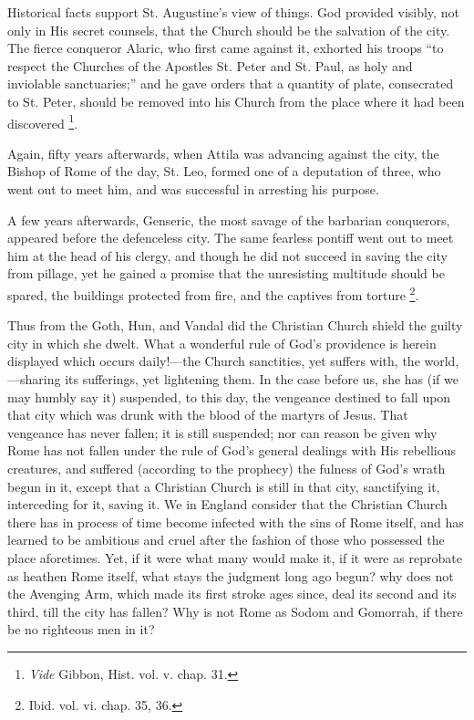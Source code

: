 Historical facts support St. Augustine's view of things. God
provided visibly, not only in His secret counsels, that the Church
should be the salvation of the city. The fierce conqueror Alaric, who
first came against it, exhorted his troops ``to respect the
Churches of the Apostles St. Peter and St. Paul, as holy and
inviolable sanctuaries;'' and he gave orders that a quantity of
plate, consecrated to St. Peter, should be removed into his
Church from the place where it had been discovered \footnote{\emph{Vide} Gibbon, Hist. vol. v. chap.
31.}.

Again, fifty years afterwards, when Attila was advancing against
the city, the Bishop of Rome of the day, St. Leo, formed one of a
deputation of three, who went out to meet him, and was successful in
arresting his purpose.

A few years afterwards, Genseric, the most savage of the barbarian
conquerors, appeared before the defenceless city. The same fearless
pontiff went out to meet him at the head of his clergy, and though he
did not succeed in saving the city from pillage, yet he gained a
promise that the unresisting multitude should be spared, the buildings
protected from fire, and the captives from torture \footnote{Ibid. vol. vi. chap. 35, 36.}.

Thus from the Goth, Hun, and Vandal did the Christian Church shield
the guilty city in which she dwelt. What a wonderful rule of God's
providence is herein displayed which occurs daily!—the Church
sanctities, yet suffers with, the world,—sharing its sufferings, yet
lightening them. In the case before us, she has (if we may humbly say
it) suspended, to this day, the vengeance destined to fall upon that
city which was drunk with the blood of the martyrs of Jesus. That
vengeance has never fallen; it is still suspended; nor can reason be
given why Rome has not fallen under the rule of God's general dealings
with His rebellious creatures, and suffered (according to the
prophecy) the fulness of God's wrath begun in it, except that a
Christian Church is still in that city, sanctifying it, interceding
for it, saving it. We in England consider that the Christian Church
there has in process of time become infected with the sins of Rome
itself, and has learned to be ambitious and cruel after the fashion of
those who possessed the place aforetimes. Yet, if it were what many
would make it, if it were as reprobate as heathen Rome itself,
what stays the judgment long ago begun? why does not the Avenging Arm,
which made its first stroke ages since, deal its second and its third,
till the city has fallen? Why is not Rome as Sodom and Gomorrah, if
there be no righteous men in it?

